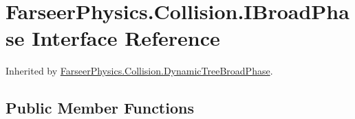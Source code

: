 \hypertarget{interface_farseer_physics_1_1_collision_1_1_i_broad_phase}{\section{Farseer\+Physics.\+Collision.\+I\+Broad\+Phase Interface Reference}
\label{interface_farseer_physics_1_1_collision_1_1_i_broad_phase}
}


Inherited by \hyperlink{class_farseer_physics_1_1_collision_1_1_dynamic_tree_broad_phase}{Farseer\+Physics.\+Collision.\+Dynamic\+Tree\+Broad\+Phase}.

\subsection*{Public Member Functions}
